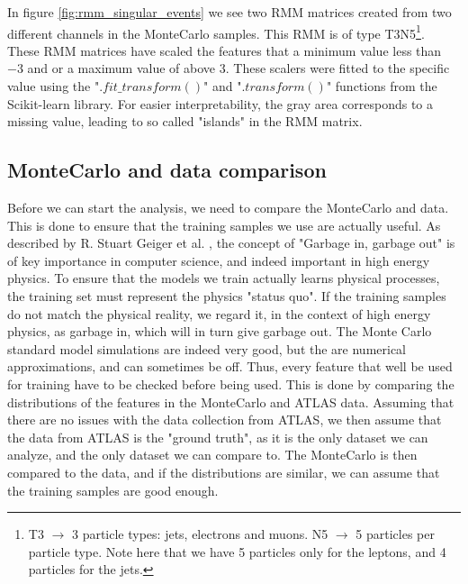 In figure \ref{fig:rmm_singular_events} we see two RMM matrices created from two different channels in the MonteCarlo samples. This RMM is of type T3N5\footnote{T3 $\to$ 3 particle types: jets, electrons and muons. N5 $\to$ 5 particles per particle type. Note here that we have 5 particles only for the leptons, and 4 particles for the jets.}. 
These RMM matrices have scaled the features that a minimum value less than $-3$ and or a maximum value of above $3$. These scalers were fitted to the specific value using the "$.fit\_transform()$" and "$.transform()$" 
functions from the Scikit-learn library\cite{scikit-learn}. For easier interpretability, the gray area corresponds to a missing value, leading to so called "islands" in the RMM matrix.


\subsection*{MonteCarlo and data comparison}\label{sec:mcdatacomp}

Before we can start the analysis, we need to compare the MonteCarlo and data. This is done to ensure that the training samples we use are actually useful. As described by R. Stuart 
Geiger et al. \cite{DBLP:journals/corr/abs-2107-02278}, the concept of "Garbage in, garbage out" is of key importance in computer science, and indeed important in high energy physics. 
To ensure that the models we train actually learns physical processes, the training set must represent the physics "status quo". If the training samples do not match the physical reality,
we regard it, in the context of high energy physics, as garbage in, which will in turn give garbage out. The Monte Carlo standard model simulations are indeed very good, but the are 
numerical approximations, and can sometimes be off. Thus, every feature that well be used for training have to be checked before being used. This is done by comparing the distributions 
of the features in the MonteCarlo and ATLAS data. Assuming that there are no issues with the data collection from ATLAS, we then assume that the data from ATLAS is the "ground truth", as it 
is the only dataset we can analyze, and the only dataset we can compare to. The MonteCarlo is then compared to the data, and if the distributions are similar, we can assume that the 
training samples are good enough. 


